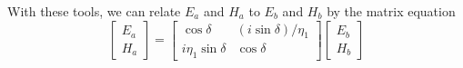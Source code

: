 \documentclass{article}
\begin{document}
    With these tools, we can relate $E_a$ and $H_a$ to $E_b$ and $H_b$ by the matrix equation
    \begin{equation}
        \label{eq:charmatrix}
        \begin{bmatrix}
            E_a \\
            H_a
        \end{bmatrix}
        =
        \begin{bmatrix}
            \cos \delta & (i \sin \delta)/\eta_1 \\
            i \eta_1 \sin \delta & \cos \delta
        \end{bmatrix}
        \begin{bmatrix}
            E_b \\
            H_b
        \end{bmatrix}        
    \end{equation}
\end{document}
